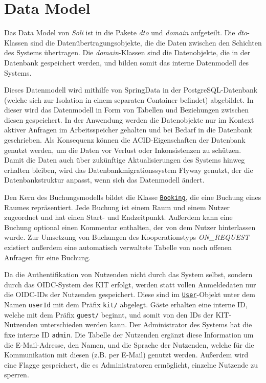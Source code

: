 
\chapter{Data Model}
\label{ch:data_model}

Das Data Model von \textit{Soli} ist in die Pakete \textit{dto} und \textit{domain} aufgeteilt.
Die \textit{dto}-Klassen sind die Datenübertragungsobjekte, die die Daten zwischen den Schichten des Systems übertragen.
Die \textit{domain}-Klassen sind die Datenobjekte, die in der Datenbank gespeichert werden, und bilden somit das interne Datenmodell des Systems.

Dieses Datenmodell wird mithilfe von \gls{SpringData} in der \gls{PostgreSQL}-Datenbank (welche sich zur Isolation in einem separaten \gls{Container} befindet) abgebildet.
In dieser wird das Datenmodell in Form von Tabellen und Beziehungen zwischen diesen gespeichert.
In der Anwendung werden die Datenobjekte nur im Kontext aktiver Anfragen im Arbeitsspeicher gehalten und bei Bedarf in die Datenbank geschrieben.
Als Konsequenz können die \gls{ACID}-Eigenschaften der Datenbank genutzt werden, um die Daten vor Verlust oder Inkonsistenzen zu schützen.
Damit die Daten auch über zukünftige Aktualisierungen des Systems hinweg erhalten bleiben, wird das Datenbankmigrationssystem \gls{Flyway} genutzt, der die Datenbankstruktur anpasst, wenn sich das Datenmodell ändert.

Den Kern des Buchungsmodells bildet die Klasse \hyperref[edu.kit.hci.soli.domain.Booking]{\texttt{Booking}}, die eine Buchung eines Raumes repräsentiert.
Jede Buchung ist einem Raum und einem Nutzer zugeordnet und hat einen Start- und Endzeitpunkt.
Außerdem kann eine Buchung optional einen Kommentar enthalten, der von dem Nutzer hinterlassen wurde.
Zur Umsetzung von Buchungen des Kooperationstyps \textit{ON\_REQUEST} existiert außerdem eine automatisch verwaltete Tabelle von noch offenen Anfragen für eine Buchung.

Da die Authentifikation von Nutzenden nicht durch das System selbst, sondern durch das \gls{OIDC}-System des KIT erfolgt, werden statt vollen Anmeldedaten nur die OIDC-IDs der Nutzenden gespeichert.
Diese sind im \hyperref[edu.kit.hci.soli.domain.User]{\texttt{User}}-Objekt unter dem Namen \texttt{userId} mit dem Präfix \texttt{kit/} abgelegt.
Gäste erhalten eine interne ID, welche mit dem Präfix \texttt{guest/} beginnt, und somit von den IDs der KIT-Nutzenden unterschieden werden kann.
Der Administrator des Systems hat die fixe interne ID \texttt{admin}.
Die Tabelle der Nutzenden ergänzt diese Information um die E-Mail-Adresse, den Namen, und die Sprache der Nutzenden, welche für die Kommunikation mit diesen (z.B. per E-Mail) genutzt werden.
Außerdem wird eine Flagge gespeichert, die es Administratoren ermöglicht, einzelne Nutzende zu sperren.

